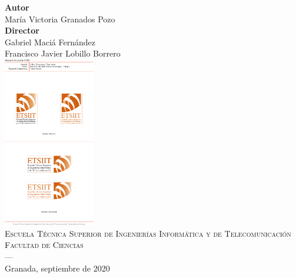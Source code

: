 \begin{titlepage}
\vspace{2.5cm}
\noindent\hspace*{\centeroffset}\begin{minipage}{\textwidth}
\centering

\textbf{Autor}\\ {María Victoria Granados Pozo}\\[2.5ex]
\textbf{Director}\\
{Gabriel Maciá Fernández\\
Francisco Javier Lobillo Borrero 
}\\[2cm]
\includegraphics[width=0.3\textwidth]{portada/imagenes/logoEtsiit.pdf}\\[0.1cm]
\textsc{Escuela Técnica Superior de Ingenierías Informática y de Telecomunicación}\\
\textsc{Facultad de Ciencias}\\

\textsc{---}\\
Granada, septiembre de 2020
\end{minipage}
\end{titlepage}


